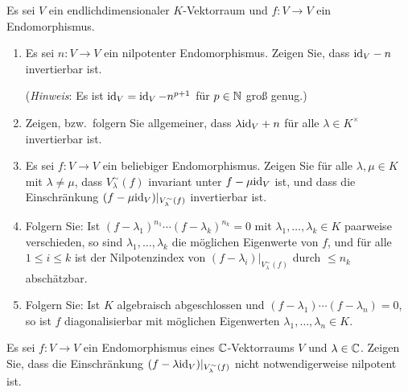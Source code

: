 \begin{question}
  Es sei $V$ ein endlichdimensionaler $K$-Vektorraum und $f \colon V \to V$ ein Endomorphismus.
  \begin{enumerate}[leftmargin=*]
    \item
      Es sei $n \colon V \to V$ ein nilpotenter Endomorphismus.
      Zeigen Sie, dass ${\operatorname{id}_V} - n$ invertierbar ist.
      
      (\emph{Hinweis}:
       Es ist $\operatorname{id}_V = \operatorname{id}_V - n^{p+1}$ für $p \in \mathbb{N}$ groß genug.)
    \item
      Zeigen, bzw.\ folgern Sie allgemeiner, dass $\lambda {\operatorname{id}_V} + n$ für alle $\lambda \in K^\times$ invertierbar ist.
    \item
      Es sei $f \colon V \to V$ ein beliebiger Endomorphismus.
      Zeigen Sie für alle $\lambda, \mu \in K$ mit $\lambda \neq \mu$, dass $V^\sim_\lambda(f)$ invariant unter $f - \mu {\operatorname{id}_V}$ ist, und dass die Einschränkung $(f - \mu {\operatorname{id}_V})|_{V^\sim_\lambda(f)}$ invertierbar ist.
    \item
      Folgern Sie:
      Ist $(f - \lambda_1)^{n_1} \dotsm (f - \lambda_k)^{n_k} = 0$ mit $\lambda_1, \dotsc, \lambda_k \in K$ paarweise verschieden, so sind $\lambda_1, \dotsc, \lambda_k$ die möglichen Eigenwerte von $f$, und für alle $1 \leq i \leq k$ ist der Nilpotenzindex von $(f - \lambda_i)|_{V^\sim_\lambda(f)}$ durch $\leq n_k$ abschätzbar.
    \item
      Folgern Sie:
      Ist $K$ algebraisch abgeschlossen und $(f - \lambda_1) \dotsm (f - \lambda_n) = 0$, so ist $f$ diagonalisierbar mit möglichen Eigenwerten $\lambda_1, \dotsc, \lambda_n \in K$.
  \end{enumerate}
\end{question}


\begin{question}
  Es sei $f \colon V \to V$ ein Endomorphismus eines $\mathbb{C}$-Vektorraums $V$ und $\lambda \in \mathbb{C}$.
  Zeigen Sie, dass die Einschränkung $(f - \lambda {\operatorname{id}_V})|_{V^\sim_\lambda(f)}$ nicht notwendigerweise nilpotent ist.
\end{question}


